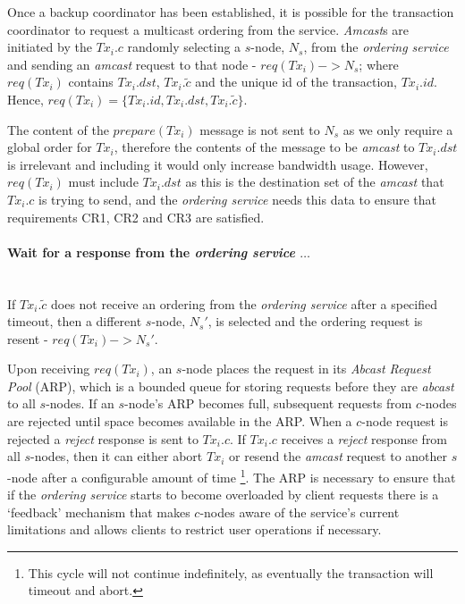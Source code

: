 \begin{enumerate}
        \leftbar        
        Once a backup coordinator has been established, it is possible for the transaction coordinator to request a multicast ordering from the service.  \emph{Amcast}s are initiated by the $Tx_i.c$ randomly selecting a $s$-node, $N_s$, from the \emph{ordering service} and sending an \emph{amcast} request to that node - $req(Tx_i) -> N_s$; where $req(Tx_i)$ contains $Tx_i.dst$, $Tx_i.\tilde{c}$ and the unique id of the transaction, $Tx_i.id$.  Hence, $req(Tx_i) = \{Tx_i.id, Tx_i.dst, Tx_i.\tilde{c}\}$.  
        
        The content of the $prepare(Tx_i)$ message is not sent to $N_s$ as we only require a global order for $Tx_i$, therefore the contents of the message to be \emph{amcast} to $Tx_i.dst$ is irrelevant and including it would only increase bandwidth usage.  However, $req(Tx_i)$ must include $Tx_i.dst$ as this is the destination set of the \emph{amcast} that $Tx_i.c$ is trying to send, and the \emph{ordering service} needs this data to ensure that requirements CR1, CR2 and CR3 are satisfied.  
        \endleftbar
        
        \paragraph{Wait for a response from the \emph{ordering service} $\ldots$} \hfill \\
                If $Tx_i.\tilde{c}$ does not receive an ordering from the \emph{ordering service} after a specified timeout, then a different $s$-node, $N_s'$, is selected and the ordering request is resent - $req(Tx_i) -> N_s'$.
        
            Upon receiving $req(Tx_i)$, an $s$-node places the request in its \emph{Abcast Request Pool} (ARP), which is a bounded queue for storing requests before they are \emph{abcast} to all $s$-nodes.  If an $s$-node's ARP becomes full, subsequent requests from $c$-nodes are rejected until space becomes available in the ARP.  When a $c$-node request is rejected a \emph{reject} response is sent to $Tx_i.c$.  If $Tx_i.c$ receives a \emph{reject} response from all $s$-nodes, then it can either abort $Tx_i$ or resend the \emph{amcast} request to another $s$-node after a configurable amount of time \footnote{This cycle will not continue indefinitely, as eventually the transaction will timeout and abort.}.  The ARP is necessary to ensure that if the \emph{ordering service} starts to become overloaded by client requests there is a \textquoteleft{}feedback' mechanism that makes $c$-nodes aware of the service's current limitations and allows clients to restrict user operations if necessary. 
            

\end{enumerate}
